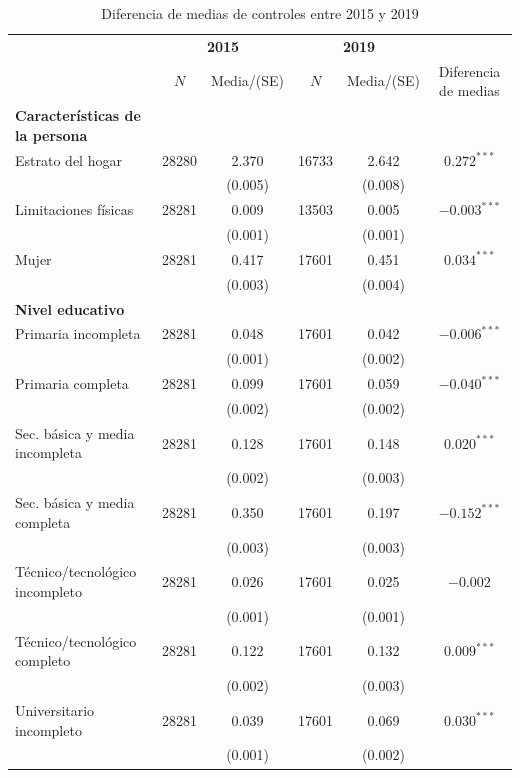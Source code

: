 \documentclass{article}
\begin{document}
\begin{table}[H]
  \centering
  \caption{Diferencia de medias de controles entre 2015 y 2019}
  \label{tab:balance_2015_2019}
  \begin{tabular}{l c c c c c}
    \toprule
    & \multicolumn{2}{c}{\textbf{2015}} & \multicolumn{2}{c}{\textbf{2019}} &  \\
    \cmidrule(lr){2-3} \cmidrule(lr){4-5}
    & $N$ & Media/(SE) & $N$ & Media/(SE) & Diferencia de medias \\
    \midrule
    \textbf{Características de la persona} & & & & & \\
    Estrato del hogar & 28280 & 2.370 & 16733 & 2.642 & $0.272^{***}$ \\
     & & (0.005) & & (0.008) & \\
    Limitaciones físicas & 28281 & 0.009 & 13503 & 0.005 & $-0.003^{***}$ \\
     & & (0.001) & & (0.001) & \\
    Mujer & 28281 & 0.417 & 17601 & 0.451 & $0.034^{***}$ \\
     & & (0.003) & & (0.004) & \\
    \midrule
    \textbf{Nivel educativo} & & & & & \\
    Primaria incompleta & 28281 & 0.048 & 17601 & 0.042 & $-0.006^{***}$ \\
     & & (0.001) & & (0.002) & \\
    Primaria completa & 28281 & 0.099 & 17601 & 0.059 & $-0.040^{***}$ \\
     & & (0.002) & & (0.002) & \\
    Sec. básica y media incompleta & 28281 & 0.128 & 17601 & 0.148 & $0.020^{***}$ \\
     & & (0.002) & & (0.003) & \\
    Sec. básica y media completa & 28281 & 0.350 & 17601 & 0.197 & $-0.152^{***}$ \\
     & & (0.003) & & (0.003) & \\
    Técnico/tecnológico incompleto & 28281 & 0.026 & 17601 & 0.025 & $-0.002$ \\
     & & (0.001) & & (0.001) & \\
    Técnico/tecnológico completo & 28281 & 0.122 & 17601 & 0.132 & $0.009^{***}$ \\
     & & (0.002) & & (0.003) & \\
    Universitario incompleto & 28281 & 0.039 & 17601 & 0.069 & $0.030^{***}$ \\
     & & (0.001) & & (0.002) & \\

\end{tabular}
\end{table}
\end{document}
